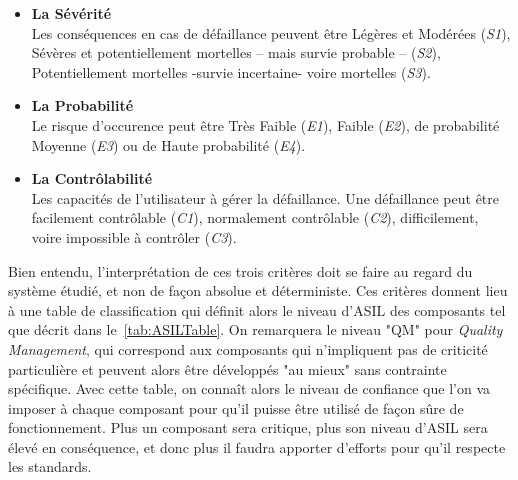 \documentclass[french, a4paper, 11pt, twoside, pdftex]{StyleThese}
\begin{document}
		\begin{itemize}
			\item 		\textbf{La Sévérité}	\\
			Les conséquences en cas de défaillance peuvent être Légères et Modérées (\emph{S1}), Sévères et potentiellement mortelles -- mais survie probable -- (\emph{S2}), Potentiellement mortelles -survie incertaine- voire mortelles (\emph{S3}). 		
			\item 		\textbf{La Probabilité} 	\\
			Le risque d'occurence peut être Très Faible (\emph{E1}), Faible (\emph{E2}), de probabilité Moyenne (\emph{E3}) ou de Haute probabilité (\emph{E4}).
			\item 		\textbf{La Contrôlabilité}	\\
			Les capacités de l'utilisateur à gérer la défaillance. Une défaillance peut être facilement contrôlable (\emph{C1}), normalement contrôlable (\emph{C2}), difficilement, voire impossible à contrôler (\emph{C3}).
		\end{itemize}
		
		Bien entendu, l'interprétation de ces trois critères doit se faire au regard du système étudié, et non de façon absolue et déterministe. 
		Ces critères donnent lieu à une table de classification qui définit alors le niveau d'ASIL des composants tel que décrit dans le~\autoref{tab:ASILTable}. On remarquera le niveau "QM" pour \textit{Quality Management}, qui correspond aux composants qui n'impliquent pas de criticité particulière et peuvent alors être développés "au mieux" sans contrainte spécifique. %
		Avec cette table, on connaît alors le niveau de confiance que l'on va imposer à chaque composant pour qu'il puisse être utilisé de façon sûre de fonctionnement. Plus un composant sera critique, plus son niveau d'ASIL sera élevé en conséquence, et donc plus il faudra apporter d'efforts pour qu'il respecte les standards.
\end{document}
